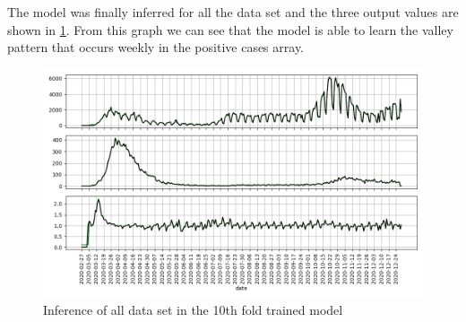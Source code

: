 \documentclass[anon]{CI}
\begin{document}
\begin{table}[t!]
 \centering
 \caption{\label{tab:3featsResults}Metrics for the best model and the 3 features reduced model}
 \end{table}

The model was finally inferred for all the data set and the three output values are shown in \ref{fig:alldatainference}. From this graph we can see that the model is able to learn the valley pattern that occurs weekly in the positive cases array. 

 \begin{figure}[!ht]
     \center
     \includegraphics[width=\linewidth]{blstm-alldata}
     \caption{\label{fig:alldatainference}Inference of all data set in the 10th fold trained model}
 \end{figure}
\end{document}
